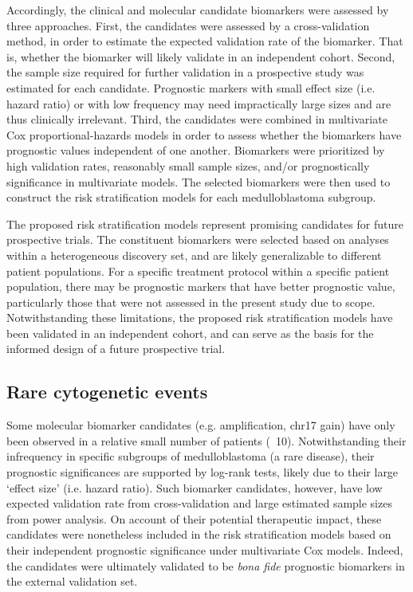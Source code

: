 Accordingly, the clinical and molecular candidate biomarkers were assessed by three approaches. First, the candidates were assessed by a cross-validation method, in order to estimate the expected validation rate of the biomarker. That is, whether the biomarker will likely validate in an independent cohort. Second, the sample size required for further validation in a prospective study was estimated for each candidate. Prognostic markers with small effect size (i.e. hazard ratio) or with low frequency may need impractically large sizes and are thus clinically irrelevant. Third, the candidates were combined in multivariate Cox proportional-hazards models in order to assess whether the biomarkers have prognostic values independent of one another. Biomarkers were prioritized by high validation rates, reasonably small sample sizes, and/or prognostically significance in multivariate models. The selected biomarkers were then used to construct the risk stratification models for each medulloblastoma subgroup.

The proposed risk stratification models represent promising candidates for future prospective trials. The constituent biomarkers were selected based on analyses within a heterogeneous discovery set, and are likely generalizable to different patient populations. For a specific treatment protocol within a specific patient population, there may be prognostic markers that have better prognostic value, particularly those that were not assessed in the present study due to scope. Notwithstanding these limitations, the proposed risk stratification models have been validated in an independent cohort, and can serve as the basis for the informed design of a future prospective trial.

\subsection{Rare cytogenetic events}

Some molecular biomarker candidates (e.g.  amplification, chr17 gain) have only been observed in a relative small number of patients (~10). Notwithstanding their infrequency in specific subgroups of medulloblastoma (a rare disease), their prognostic significances are supported by log-rank tests, likely due to their large `effect size’ (i.e. hazard ratio). Such biomarker candidates, however, have low expected validation rate from cross-validation and large estimated sample sizes from power analysis. On account of their potential therapeutic impact, these candidates were nonetheless included in the risk stratification models based on their independent prognostic significance under multivariate Cox models. Indeed, the candidates were ultimately validated to be \emph{bona fide} prognostic biomarkers in the external validation set.

